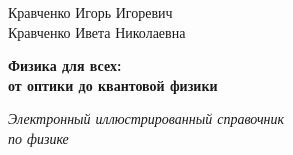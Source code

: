 \begin{titlepage}
    \begin{center}
        \vspace*{0.5cm}
        
        \Large
        Кравченко Игорь Игоревич\\
        Кравченко Ивета Николаевна
        
        \vspace{1cm}
        \Huge
        \textbf{Физика для всех:\\
        от оптики до квантовой физики}
        
        \vspace{1.5cm}
        
        \vfill
        \Large
        \textit{Электронный иллюстрированный справочник\\
        по физике}
        
        \vspace{15cm}

    \end{center}
\end{titlepage}